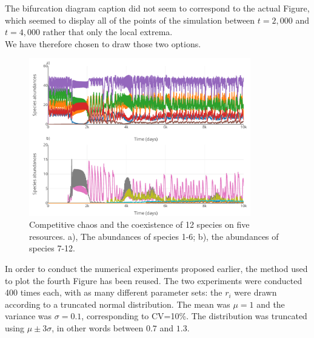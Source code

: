 The bifurcation diagram caption did not seem to correspond to the actual 
Figure, which seemed to display all of the points of the simulation between 
$t=2,000$ and $t=4,000$ rather that only the local extrema.\\
We have therefore chosen to draw those two options. 
\begin{figure}[H]
\begin{center} 
 \includegraphics[width=0.86\textwidth]{../Code/Figures/Figure_4.pdf}
  \caption{Competitive chaos and the coexistence of 12 species on five 
resources. a), The abundances of species 1-6; b), the abundances of species 7-12.}
  \label{figures:Fig4}
\end{center}
  \end{figure}
In order to conduct the numerical experiments proposed earlier, the method used to plot the 
fourth Figure has been reused. The two experiments were conducted 400 times each, 
with as many different parameter sets: the $r_i$ were drawn according to a 
truncated normal distribution. The mean was $\mu=1$ and the variance was 
$\sigma=0.1$, corresponding to CV=10\%. The distribution was truncated using $\mu\pm3\sigma$, in other 
words between $0.7$ and $1.3$.\\~\\

